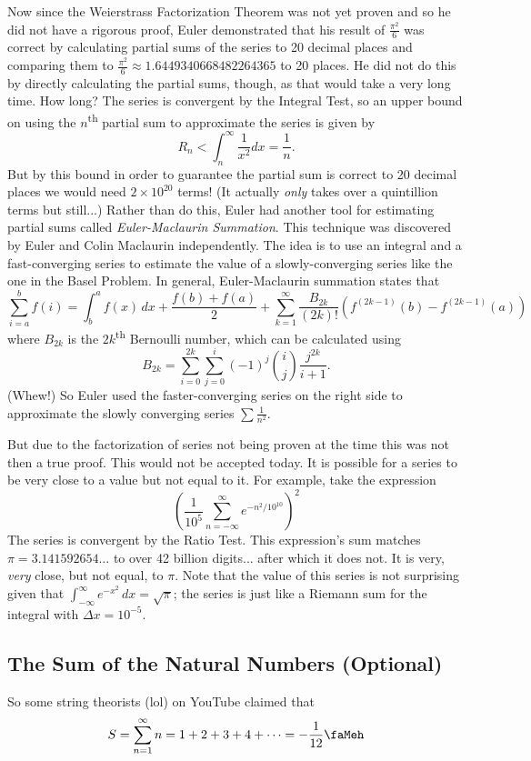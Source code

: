 \documentclass[letterpaper, 11pt, openany]{book}
\theoremstyle{mytheoremstyle}
\theoremstyle{myexamplestyle}
\begin{document}
Now since the Weierstrass Factorization Theorem was not yet proven and so he did not have a rigorous proof, Euler demonstrated that his result of $\frac{\pi^2}{6}$ was correct by calculating partial sums of the series to 20 decimal places and comparing them to $\frac{\pi^2}{6} \approx 1.6449340668482264365$ to 20 places. He did not do this by directly calculating the partial sums, though, as that would take a very long time. How long? The series is convergent by the Integral Test, so an upper bound on using the $n$\textsuperscript{th} partial sum to approximate the series is given by
\[R_n < \int_n^\infty \frac{1}{x^2} dx = \frac{1}{n}.\]
But by this bound in order to guarantee the partial sum is correct to 20 decimal places we would need $2 \times 10^{20}$ terms! (It actually \textit{only} takes over a quintillion terms but still...) Rather than do this, Euler had another tool for estimating partial sums called \textit{Euler-Maclaurin Summation}. This technique was discovered by Euler and Colin Maclaurin independently. The idea is to use an integral and a fast-converging series to estimate the value of a slowly-converging series like the one in the Basel Problem. In general, Euler-Maclaurin summation states that
\[
	\sum_{i=a}^{b} f(i) = \int_{b}^{a} f(x)\, dx + \frac{f(b)+f(a)}{2} + \sum_{k=1}^{\infty} \frac{B_{2k}}{(2k)!}\left(f^{(2k-1)}(b) - f^{(2k-1)}(a)\right)\]
where $B_{2k}$ is the $2k$\textsuperscript{th} Bernoulli number, which can be calculated using
\[B_{2k} = \sum_{i=0}^{2k}\sum_{j=0}^{i} (-1)^{j} \binom{i}{j}\frac{j^{2k}}{i+1}.\]
(Whew!) So Euler used the faster-converging series on the right side to approximate the slowly converging series $\sum \frac{1}{n^2}$.

But due to the factorization of series not being proven at the time this was not then a true proof. This would not be accepted today. It is  possible for a series to be very close to a value but not equal to it. For example, take the expression
\[\left(\frac{1}{10^5} \sum_{n=-\infty}^{\infty} e^{-n^2/10^{10}}\right)^2\]
 The series is convergent by the Ratio Test. This expression's sum matches $\pi = 3.141592654\ldots$ to over 42 billion digits... after which it does not. It is very, \textit{very} close, but not equal, to $\pi$. Note that the value of this series is not surprising given that $\displaystyle \int_{-\infty}^{\infty} e^{-x^{2}} \, dx = \sqrt{\pi}$; the series is just like a Riemann sum for the integral with $\Delta x = 10^{-5}$.

\subsection{The Sum of the Natural Numbers (Optional)}
So some string theorists (lol) on YouTube claimed that
\[S = \sum_{n=1}^{\infty} n = 1 + 2 + 3 + 4 + \cdots  = -\frac{1}{12} \text{\faMeh}\]
\end{document}
